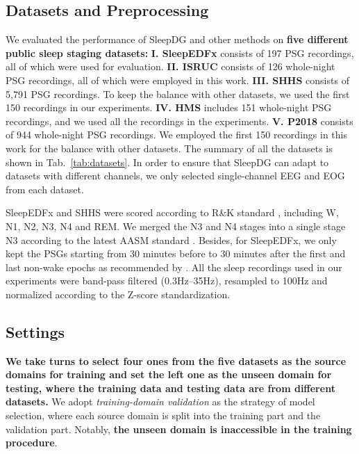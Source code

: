 \documentclass[letterpaper]{article} %
\begin{document}
	\subsection{Datasets and Preprocessing}

	We evaluated the performance of SleepDG and other methods on \textbf{five different public sleep staging datasets:}
	\textbf{I. SleepEDFx} \citep{Kemp2000AnalysisOA, Goldberger2000PhysioBankPA} consists of 197 PSG recordings, all of which were used for evaluation.
	\textbf{II. ISRUC} \citep{khalighi2016isruc} consists of 126 whole-night PSG recordings, all of which were employed in this work.
	\textbf{III. SHHS} \citep{zhang2018national, quan1997sleep} consists of 5,791 PSG recordings.
	To keep the balance with other datasets, we used the first 150 recordings in our experiments.
	\textbf{IV. HMS} \citep{alvarez2021inter} includes 151 whole-night PSG recordings, and we used all the recordings in the experiments.
	\textbf{V. P2018} \citep{ghassemi2018you} consists of 944 whole-night PSG recordings.
	We employed the first 150 recordings in this work for the balance with other datasets.
	The summary of all the datasets is shown in Tab.~\ref{tab:datasets}.
	In order to ensure that SleepDG can adapt to datasets with different channels, we only selected single-channel EEG and EOG from each dataset.

	SleepEDFx and SHHS were scored according to R\&K standard \citep{Wolpert1969AMO}, including W, N1, N2, N3, N4 and REM.
	We merged the N3 and N4 stages into a single stage N3 according to the latest AASM standard \citep{Iber2007TheAA}.
	Besides, for SleepEDFx, we only kept the PSGs starting from 30 minutes before to 30 minutes after the first and last non-wake epochs as recommended by \citet{Supratak2017DeepSleepNetAM}.
	All the sleep recordings used in our experiments were band-pass filtered (0.3Hz--35Hz), resampled to 100Hz and normalized according to the Z-score standardization.



	\subsection{Settings}
	\textbf{We take turns to select four ones from the five datasets as the source domains for training and set the left one as the unseen domain for testing, where the training data and testing data are from different datasets.}
	We adopt \textit{training-domain validation} \citep{wang2022generalizing} as the strategy of model selection, where each source domain is split into the training part and the validation part.
	Notably, \textbf{the unseen domain is inaccessible in the training procedure}.
\end{document}
